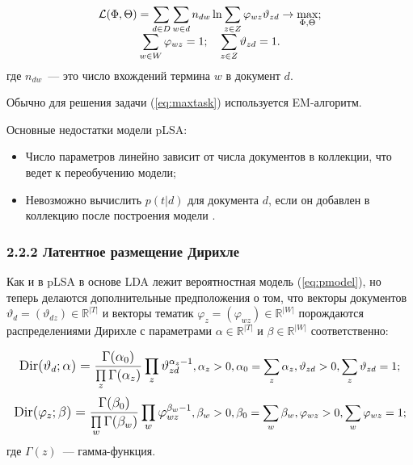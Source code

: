 \documentclass[a4paper]{report}
\begin{document}
	\begin{equation}
		\begin{array}{c c}
		\mathcal{L}(\Phi,\Theta) = \mathlarger{ 
			\sum_{d \in D} 
			\sum_{w \in d}
			n_{dw} 
			\ln \sum_{z \in Z}
			\varphi_{wz} \vartheta_{zd} 
			\rightarrow \max_{\Phi, \Theta};
			} \\
		\mathlarger{
			\sum_{w \in W} \varphi_{wz} = 1; \quad \sum_{z \in Z} \vartheta_{zd} = 1.
		}
		\end{array}
	\label{eq:maxtask}
	\end{equation}
	где $n_{dw}$~--- это число вхождений термина $w$ в документ $d$.
	
	Обычно для решения задачи (\ref{eq:maxtask}) используется EM-алгоритм.
	
	Основные недостатки модели pLSA:
	\begin{itemize}
	\item{Число параметров линейно зависит от числа документов в коллекции, что ведет к переобучению модели;}
	\item{Невозможно вычислить $p(t|d)$ для документа $d$, если он добавлен в коллекцию после построения модели \cite{bib:Voron1} . }
	\end{itemize}
	
	
	\subsubsection{2.2.2 Латентное размещение Дирихле}
	
	Как и в pLSA в основе LDA лежит вероятностная модель (\ref{eq:pmodel}), но теперь делаются дополнительные предположения о том, что 
	векторы документов $\vartheta_d = (\vartheta_{dz}) \in \mathbb{R}^{|T|}$ 
	и 
	векторы тематик $\varphi_z = (\varphi_{wz}) \in \mathbb{R}^{|W|}$ 
	порождаются распределениями Дирихле с параметрами 
	$ \alpha \in \mathbb{R}^{|T|} $ 
	и
	$ \beta \in \mathbb{R}^{|W|} $ соответственно:
	
	$$  \mathlarger{
		\text{Dir}(\vartheta_d; \alpha) = 
		\dfrac
			{ \Gamma(\alpha_0)			}
			{ \prod \limits_z \Gamma (\alpha_z) }
		\prod_z \vartheta_{zd}^{\alpha_z - 1}
		},
		\alpha_z > 0, 
		\alpha_0 = \sum_z \alpha_z,
		\vartheta_{zd} > 0, 
		\sum_z \vartheta_{zd} = 1;		
	$$
	$$  \mathlarger{
		\text{Dir}(\varphi_z; \beta) = 
		\dfrac
			{ \Gamma(\beta_0)			}
			{ \prod \limits_w \Gamma (\beta_w) }
		\prod_w \varphi_{wz}^{\beta_w - 1}
		},
		\beta_w > 0, 
		\beta_0 = \sum_w \beta_w,
		\varphi_{wz} > 0, 
		\sum_w \varphi_{wz} = 1;	
	$$
	где $\Gamma (z) $~--- гамма-функция.
	
\end{document}
